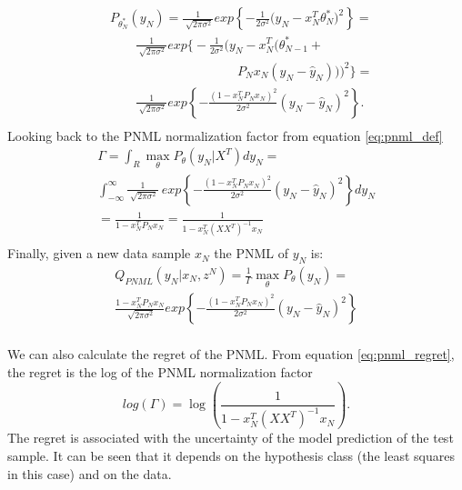 \documentclass[conference,letterpaper]{IEEEtran}
\begin{document}
\begin{equation}
\begin{split}
&P_{\theta_N ^*}(y_N) 
=\frac{1}{\sqrt[]{2\pi\sigma^2}}exp\left\{-\frac{1}{2\sigma^2}\big(y_N- x_N^T\theta ^*_N \big)^2\right\} = \\
& \qquad \frac{1}{\sqrt[]{2\pi\sigma^2}}exp\bigg\{-\frac{1}{2\sigma^2}\big(y_N - x_N^T \big(\theta^*_{N-1} + \\ 
& \qquad \qquad \qquad \qquad \qquad P_N x_N (y_N -\hat{y}_N) \big) \big)^2\bigg\} = \\
& \qquad \frac{1}{\sqrt[]{2\pi\sigma^2}}
exp\left\{-\frac{(1 - x_N^T P_N x_N )^2 }{2\sigma^2}\left(y_N-\hat{y}_N \right)^2\right\}.  \\
\end{split}
\end{equation}
Looking back to the PNML normalization factor from equation \ref{eq:pnml_def}
\begin{multline}
\Gamma = \int_R \max_{\theta} P_\theta(y_N|X^T)dy_N = \\
\int_{-\infty}^{\infty} \frac{1}{\sqrt[]{2\pi\sigma^2}}
\ exp\left\{-\frac{(1 - x_N^T P_N x_N )^2 }{2\sigma^2}
\left(y_N- \hat{y}_N \right)^2\right\} dy_N\\ 
=\frac{1}{1 - x_N^T P_N x_N } 
=\frac{1}{1 - x_N^T (XX^T)^{-1} x_N } \\
\end{multline}
Finally, given a new data sample $x_N$ the PNML of $y_N$ is:
\begin{multline}
Q_{PNML}(y_N | x_N, z^N) = \frac{1}{\Gamma}\max_{\theta}P_{\theta}(y_N) = \\
\frac{1 - x_N^T P_N x_N }{\sqrt[]{2\pi\sigma^2}}
exp\left\{-\frac{(1 - x_N^T P_N x_N )^2 }{2\sigma^2}\left(y_N-\hat{y}_N \right)^2\right\} \\
\end{multline}

We can also calculate the regret of the PNML. From equation \ref{eq:pnml_regret}, the regret is the log of the PNML normalization factor
\begin{equation} \label{eq:regret}
log(\Gamma) = \log\left(\frac{1}{1 - x_N^T (XX^T)^{-1} x_N } \right).
\end{equation}
The regret is associated with the uncertainty of the model prediction of the test sample. It can be seen that it depends on the hypothesis class (the least squares in this case) and on the data.
\end{document}
